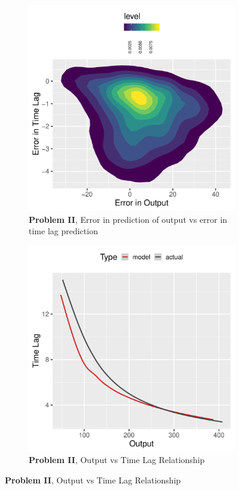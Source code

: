 \documentclass[envcountsect,runningheads]{llncs}
\theoremstyle{etoile}
\begin{document}
\begin{figure}
  \begin{subfigure}[b]{0.4\textwidth}
    \centering
    \includegraphics[width=\textwidth]{figures/exp2_errors}
    \caption{ \textbf{Problem II}, Error in prediction of output vs error in time lag prediction} 
    \label{fig:problem2_error}
  \end{subfigure}
  \hfill
  \begin{subfigure}[b]{0.4\textwidth}
    \centering
    \includegraphics[width=\textwidth]{figures/exp2_predictive_curves}
    \caption{ \textbf{Problem II}, Output vs Time Lag Relationship} 
    \label{fig:problem2_curves}
  \end{subfigure}


\end{figure}
\end{document}
